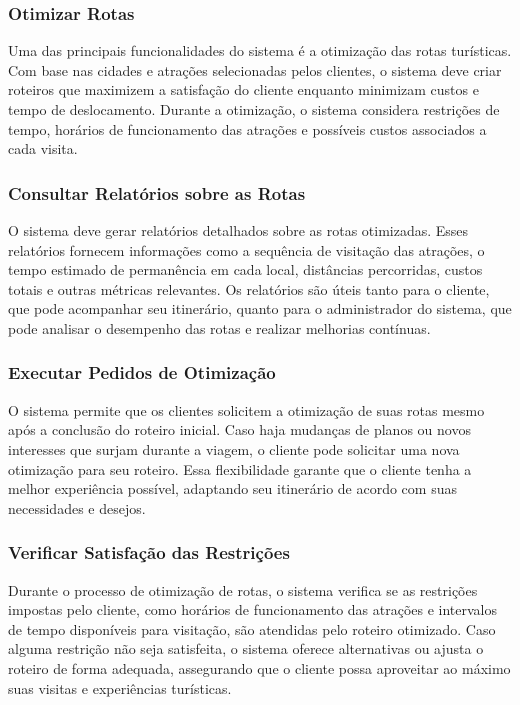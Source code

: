\subsubsection{Otimizar Rotas}
Uma das principais funcionalidades do sistema é a otimização das rotas turísticas. Com base nas cidades e atrações selecionadas pelos clientes, o sistema deve criar roteiros que maximizem a satisfação do cliente enquanto minimizam custos e tempo de deslocamento. Durante a otimização, o sistema considera restrições de tempo, horários de funcionamento das atrações e possíveis custos associados a cada visita.

\subsubsection{Consultar Relatórios sobre as Rotas}
O sistema deve gerar relatórios detalhados sobre as rotas otimizadas. Esses relatórios fornecem informações como a sequência de visitação das atrações, o tempo estimado de permanência em cada local, distâncias percorridas, custos totais e outras métricas relevantes. Os relatórios são úteis tanto para o cliente, que pode acompanhar seu itinerário, quanto para o administrador do sistema, que pode analisar o desempenho das rotas e realizar melhorias contínuas.

\subsubsection{Executar Pedidos de Otimização}
O sistema permite que os clientes solicitem a otimização de suas rotas mesmo após a conclusão do roteiro inicial. Caso haja mudanças de planos ou novos interesses que surjam durante a viagem, o cliente pode solicitar uma nova otimização para seu roteiro. Essa flexibilidade garante que o cliente tenha a melhor experiência possível, adaptando seu itinerário de acordo com suas necessidades e desejos.

\subsubsection{Verificar Satisfação das Restrições}
Durante o processo de otimização de rotas, o sistema verifica se as restrições impostas pelo cliente, como horários de funcionamento das atrações e intervalos de tempo disponíveis para visitação, são atendidas pelo roteiro otimizado. Caso alguma restrição não seja satisfeita, o sistema oferece alternativas ou ajusta o roteiro de forma adequada, assegurando que o cliente possa aproveitar ao máximo suas visitas e experiências turísticas.

